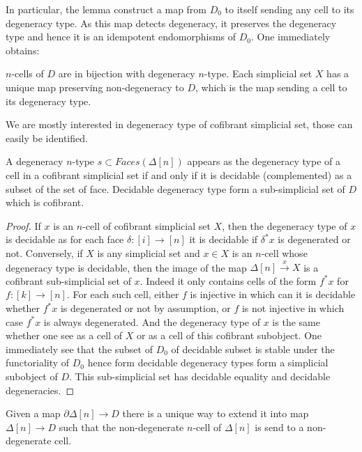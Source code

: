 \documentclass[reqno,10pt,a4paper,oneside,draft]{amsart}
\begin{document}
In particular, the lemma construct a map from $D_0$ to itself sending any cell to its degeneracy type. As this map detects degeneracy, it preserves the degeneracy type and hence it is an idempotent endomorphisms of $D_0$. One immediately obtains:

\begin{lemma}
$n$-cells of $D$ are in bijection with degeneracy $n$-type. Each simplicial set $X$ has a unique map preserving non-degeneracy to $D$, which is the map sending a cell to its degeneracy type.
\end{lemma}




We are mostly interested in degeneracy type of cofibrant simplicial set, those can easily be identified.

\begin{lemma}
A degeneracy $n$-type $s \subset Faces(\Delta[n])$ appears as the degeneracy type of a cell in a cofibrant simplicial set if and only if it is decidable (complemented) as a subset of the set of face. Decidable degeneracy type form a sub-simplicial set of $D$ which is cofibrant.
\end{lemma}

\begin{proof}
If $x$ is an $n$-cell of cofibrant simplicial set $X$, then the degeneracy type of $x$ is decidable as for each face $\delta:[i] \rightarrow [n]$ it is decidable if $\delta^* x $ is degenerated or not.
Conversely, if $X$ is any simplicial set and $x \in X$ is an $n$-cell whose degeneracy type is decidable, then the image of the map $\Delta[n] \overset{x}{\rightarrow} X$ is a cofibrant sub-simplicial set of $x$. Indeed it only contains cells of the form $f^*x$ for $f:[k] \rightarrow [n]$. For each such cell, either $f$ is injective in which can it is decidable whether $f^*x$ is degenerated or not by assumption, or $f$ is not injective in which case $f^*x$ is always degenerated. And the degeneracy type of $x$ is the same whether one see as a cell of $X$ or as a cell of this cofibrant subobject.
One immediately see that the subset of $D_0$ of decidable subset is stable under the functoriality of $D_0$ hence form decidable degeneracy types form a simplicial subobject of $D$. This sub-simplicial set has decidable equality and decidable degeneracies.
\end{proof}

\begin{lemma}

Given a map $\partial \Delta[n] \rightarrow D$ there is a unique way to extend it into map $\Delta[n] \rightarrow D$ such that the non-degenerate $n$-cell of $\Delta[n]$ is send to a non-degenerate cell.
\end{lemma}
\end{document}
